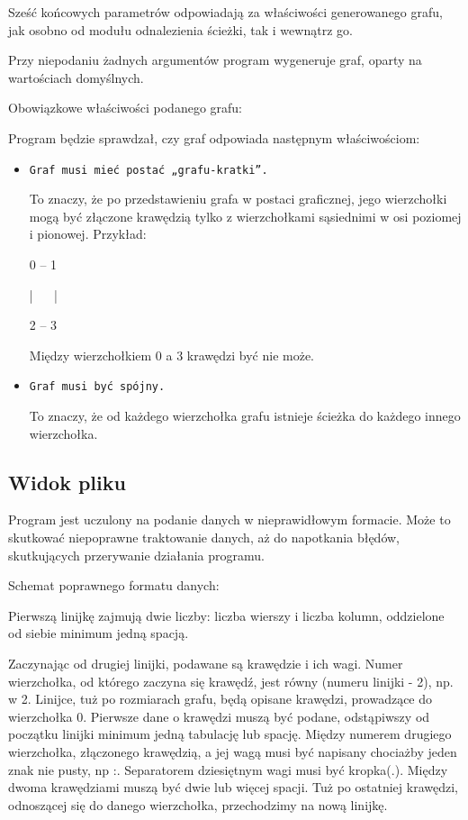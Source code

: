 \documentclass[]{article}
\begin{document}
Sześć końcowych parametrów odpowiadają za właściwości generowanego grafu, jak osobno od modułu odnalezienia ścieżki, tak i wewnątrz go.

Przy niepodaniu żadnych argumentów program wygeneruje graf, oparty na wartościach domyślnych.

Obowiązkowe właściwości podanego grafu:

Program będzie sprawdzał, czy graf odpowiada następnym właściwościom:
\begin{itemize}
    \item \texttt{Graf musi mieć postać „grafu-kratki”. }
    
To znaczy, że po przedstawieniu grafa w postaci graficznej, jego wierzchołki mogą być złączone krawędzią tylko z wierzchołkami sąsiednimi w osi poziomej i pionowej. Przykład:

0 – 1

|\, \, \, \,|

2 – 3  

Między wierzchołkiem 0 a 3 krawędzi być nie może.
    \item \texttt{Graf musi być spójny.}

To znaczy, że od każdego wierzchołka grafu istnieje ścieżka do każdego innego wierzchołka.

\end{itemize}

\subsection{Widok pliku}
Program jest uczulony na podanie danych w nieprawidłowym formacie. Może to skutkować niepoprawne traktowanie danych, aż do napotkania błędów, skutkujących przerywanie działania programu. 

Schemat poprawnego formatu danych:

Pierwszą linijkę zajmują dwie liczby: liczba wierszy i liczba kolumn, oddzielone od siebie minimum jedną spacją.

Zaczynając od drugiej linijki, podawane są krawędzie i ich wagi. Numer wierzchołka, od którego zaczyna się krawędź, jest równy (numeru linijki - 2), np. w 2. Linijce, tuż po rozmiarach grafu, będą opisane krawędzi, prowadzące do wierzchołka 0. Pierwsze dane o krawędzi muszą być podane, odstąpiwszy od początku linijki minimum jedną tabulację lub spację. Między numerem drugiego wierzchołka, złączonego krawędzią, a jej wagą musi być napisany chociażby jeden znak nie pusty, np :. Separatorem dziesiętnym wagi musi być kropka(.). Między dwoma krawędziami muszą być dwie lub więcej spacji. Tuż po ostatniej krawędzi, odnoszącej się do danego wierzchołka, przechodzimy na nową linijkę.
\end{document}
